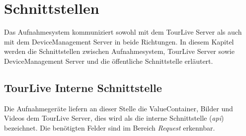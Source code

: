 \chapter{Schnittstellen}

Das Aufnahmesystem kommuniziert sowohl mit dem TourLive Server als auch mit dem DeviceManagement Server in beide Richtungen. In diesem Kapitel werden die Schnittstellen zwischen Aufnahmesystem, TourLive Server sowie DeviceManagement Server und die öffentliche Schnittstelle erläutert.

\section{TourLive Interne Schnittstelle}
\label{sec:tourliveserverapi}
Die Aufnahmegeräte liefern an dieser Stelle die ValueContainer, Bilder und Videos dem TourLive Server, dies wird als die interne Schnittstelle (\textit{\gls{api}}) bezeichnet. Die benötigten Felder sind im Bereich \textit{Request} erkennbar.
